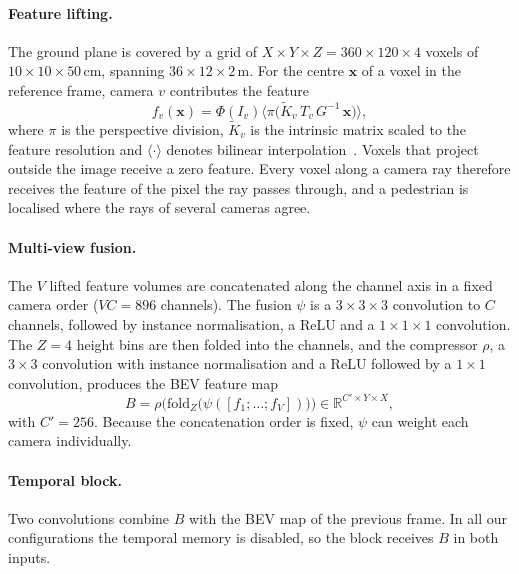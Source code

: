 \documentclass[10pt,twocolumn,letterpaper]{article}
\newcommand{\R}{\mathbb{R}}
\begin{document}
\paragraph{Feature lifting.} The ground plane is covered by a grid of $X \times Y \times Z = 360 \times 120 \times 4$
voxels of $10 \times 10 \times 50$\,cm, spanning $36 \times 12 \times 2$\,m. For the centre $\mathbf{x}$ of a voxel in
the reference frame, camera $v$ contributes the feature
\begin{equation}
  f_v(\mathbf{x}) = \Phi(I_v)\big\langle \pi\big(\tilde{K}_v\, T_v\, G^{-1}\, \mathbf{x}\big) \big\rangle,
  \label{eq:lift}
\end{equation}
where $\pi$ is the perspective division, $\tilde{K}_v$ is the intrinsic matrix scaled to the feature resolution and
$\langle\cdot\rangle$ denotes bilinear interpolation~\cite{harley2023simplebev}. Voxels that project outside the
image receive a zero feature. Every voxel along a camera ray therefore receives the feature of the pixel the ray
passes through, and a pedestrian is localised where the rays of several cameras agree.

\paragraph{Multi-view fusion.} The $V$ lifted feature volumes are concatenated along the channel axis in a fixed
camera order ($V C = 896$ channels). The fusion $\psi$ is a $3 \times 3 \times 3$ convolution to $C$ channels,
followed by instance normalisation, a ReLU and a $1 \times 1 \times 1$ convolution. The $Z = 4$ height bins are then
folded into the channels, and the compressor $\rho$, a $3 \times 3$ convolution with instance normalisation and a ReLU
followed by a $1 \times 1$ convolution, produces the BEV feature map
\begin{equation}
  B = \rho\Big(\mathrm{fold}_Z\big(\psi([f_1; \dots; f_V])\big)\Big) \in \R^{C' \times Y \times X},
  \label{eq:fuse}
\end{equation}
with $C' = 256$. Because the concatenation order is fixed, $\psi$ can weight each camera individually.

\paragraph{Temporal block.} Two convolutions combine $B$ with the BEV map of the previous frame. In all our
configurations the temporal memory is disabled, so the block receives $B$ in both inputs.
\end{document}
